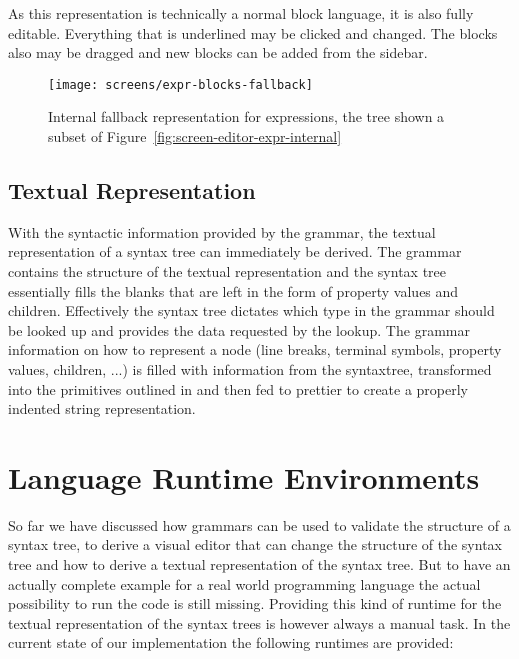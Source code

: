 \documentclass[sigconf,natbib=false,review=true,anonymous]{acmart}
\begin{document}
As this representation is technically a normal block language, it is also fully editable. Everything that is underlined may be clicked and changed. The blocks also may be dragged and new blocks can be added from the sidebar.

\begin{figure}
  \texttt{[image: screens/expr-blocks-fallback]}
  \caption{Internal fallback representation for expressions, the tree shown a subset of Figure~\ref{fig:screen-editor-expr-internal}}
  \label{fig:screen-editor-expr-fallback}
\end{figure}

\subsection{Textual Representation}

With the syntactic information provided by the grammar, the textual representation of a syntax tree can immediately be derived. The grammar contains the structure of the textual representation and the syntax tree essentially fills the blanks that are left in the form of property values and children. Effectively the syntax tree dictates which type in the grammar should be looked up and provides the data requested by the lookup. The grammar information on how to represent a node (line breaks, terminal symbols, property values, children, ...) is filled with information from the syntaxtree, transformed into the primitives outlined in \cite{wadler_prettier_printer} and then fed to prettier to create a properly indented string representation.

\section{Language Runtime Environments}
So far we have discussed how grammars can be used to validate the structure of a syntax tree, to derive a visual editor that can change the structure of the syntax tree and how to derive a textual representation of the syntax tree. But to have an actually complete example for a real world programming language the actual possibility to run the code is still missing. Providing this kind of runtime for the textual representation of the syntax trees is however always a manual task. In the current state of our implementation the following runtimes are provided:
\end{document}
